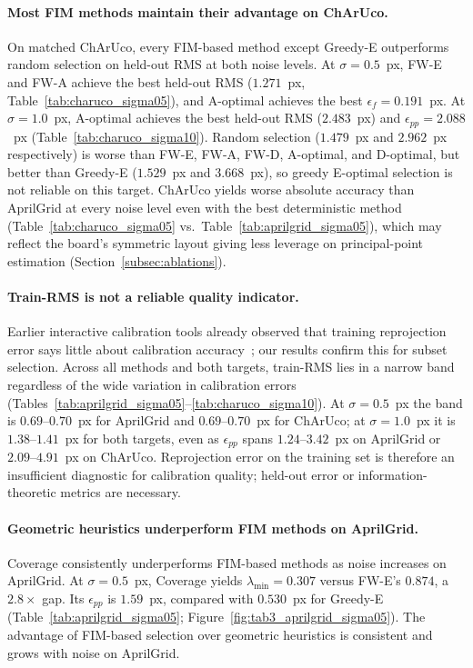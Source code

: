 \documentclass[letterpaper, 9
 pt, conference]{ieeeconf}
\begin{document}
\paragraph{Most FIM methods maintain their advantage on ChArUco.}
On matched ChArUco, every FIM-based method except Greedy-E outperforms random
selection on held-out RMS at both noise levels.
At $\sigma{=}0.5$~px, FW-E and FW-A achieve the best held-out RMS
($1.271$~px, Table~\ref{tab:charuco_sigma05}), and A-optimal achieves the
best $\epsilon_f{=}0.191$~px.
At $\sigma{=}1.0$~px, A-optimal achieves the best held-out RMS ($2.483$~px)
and $\epsilon_{pp}{=}2.088$~px (Table~\ref{tab:charuco_sigma10}).
Random selection ($1.479$~px and $2.962$~px respectively) is worse than
FW-E, FW-A, FW-D, A-optimal, and D-optimal, but better than Greedy-E
($1.529$~px and $3.668$~px), so greedy E-optimal selection is not reliable
on this target.
ChArUco yields worse absolute accuracy than AprilGrid at every noise level
even with the best deterministic method
(Table~\ref{tab:charuco_sigma05} vs.\ Table~\ref{tab:aprilgrid_sigma05}),
which may reflect the board's symmetric layout giving less leverage
on principal-point estimation (Section~\ref{subsec:ablations}).

\paragraph{Train-RMS is not a reliable quality indicator.}
Earlier interactive calibration tools already observed that training
reprojection error says little about calibration accuracy~\citep{richardson2013aprilcal,peng2019calibration};
our results confirm this for subset selection.
Across all methods and both targets, train-RMS lies in a narrow band
regardless of the wide variation in calibration errors
(Tables~\ref{tab:aprilgrid_sigma05}--\ref{tab:charuco_sigma10}).
At $\sigma{=}0.5$~px the band is $0.69$--$0.70$~px for AprilGrid and
$0.69$--$0.70$~px for ChArUco; at $\sigma{=}1.0$~px it is $1.38$--$1.41$~px
for both targets, even as $\epsilon_{pp}$ spans $1.24$--$3.42$~px on AprilGrid
or $2.09$--$4.91$~px on ChArUco.
Reprojection error on the training set is therefore an insufficient diagnostic
for calibration quality; held-out error or information-theoretic metrics are
necessary.

\paragraph{Geometric heuristics underperform FIM methods on AprilGrid.}
Coverage consistently underperforms FIM-based methods as noise
increases on AprilGrid.
At $\sigma{=}0.5$~px, Coverage yields $\lambda_{\min}{=}0.307$ versus
FW-E's $0.874$, a $2.8\times$ gap. Its $\epsilon_{pp}$ is $1.59$~px, compared with
$0.530$~px for Greedy-E (Table~\ref{tab:aprilgrid_sigma05}; Figure~\ref{fig:tab3_aprilgrid_sigma05}).
The advantage of FIM-based selection over geometric heuristics is consistent
and grows with noise on AprilGrid.
\end{document}
